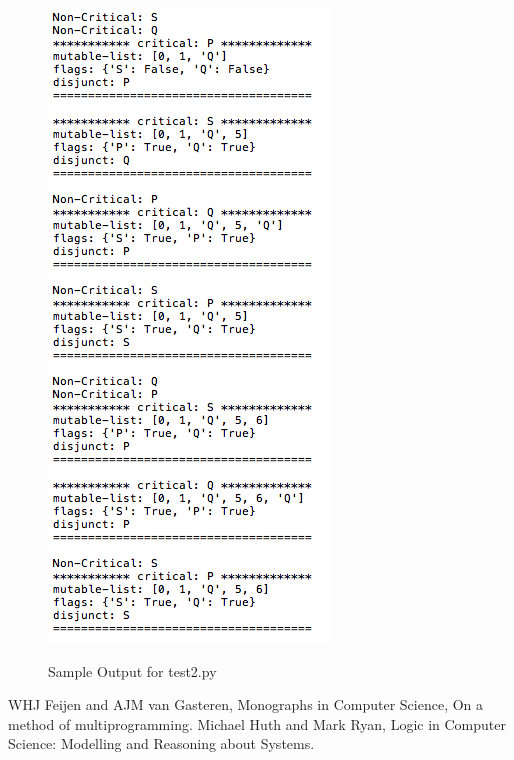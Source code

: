 \documentclass[18pt]{extarticle}
\begin{document}
 \begin{figure}[h]
  \includegraphics[scale=0.7]{t2}
  \label{fig:}
 \caption{Sample Output for test2.py}
\end{figure}


\begin{thebibliography}{9}
  WHJ Feijen and AJM van Gasteren,
  Monographs in Computer Science, On a method of multiprogramming.
  Michael Huth and Mark Ryan, 
  Logic in Computer Science: Modelling and Reasoning about Systems.
\end{thebibliography}
\end{document}
